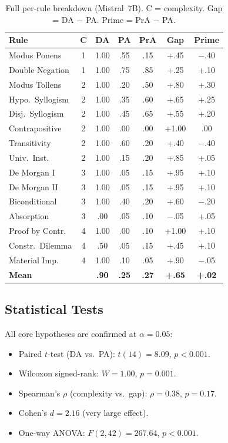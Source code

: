 \documentclass{article}
\newcommand{\da}{\textsc{DA}}
\newcommand{\pa}{\textsc{PA}}
\begin{document}
\begin{table}[t]
\centering
\small
\begin{tabular}{lcccccc}
\toprule
\textbf{Rule} & \textbf{C} & \textbf{DA} & \textbf{PA} & \textbf{PrA} & \textbf{Gap} & \textbf{Prime} \\
\midrule
Modus Ponens      & 1 & 1.00 & .55 & .15 & +.45 & $-$.40 \\
Double Negation   & 1 & 1.00 & .75 & .85 & +.25 & +.10 \\
Modus Tollens     & 2 & 1.00 & .20 & .50 & +.80 & +.30 \\
Hypo.\ Syllogism  & 2 & 1.00 & .35 & .60 & +.65 & +.25 \\
Disj.\ Syllogism  & 2 & 1.00 & .45 & .65 & +.55 & +.20 \\
Contrapositive    & 2 & 1.00 & .00 & .00 & +1.00 & .00 \\
Transitivity      & 2 & 1.00 & .60 & .20 & +.40 & $-$.40 \\
Univ.\ Inst.      & 2 & 1.00 & .15 & .20 & +.85 & +.05 \\
De Morgan I       & 3 & 1.00 & .05 & .15 & +.95 & +.10 \\
De Morgan II      & 3 & 1.00 & .05 & .15 & +.95 & +.10 \\
Biconditional     & 3 & 1.00 & .40 & .20 & +.60 & $-$.20 \\
Absorption        & 3 & .00 & .05 & .10 & $-$.05 & +.05 \\
Proof by Contr.   & 4 & 1.00 & .00 & .10 & +1.00 & +.10 \\
Constr.\ Dilemma  & 4 & .50 & .05 & .15 & +.45 & +.10 \\
Material Imp.     & 4 & 1.00 & .10 & .05 & +.90 & $-$.05 \\
\midrule
\textbf{Mean}     &   & \textbf{.90} & \textbf{.25} & \textbf{.27} & \textbf{+.65} & \textbf{+.02} \\
\bottomrule
\end{tabular}
\caption{Full per-rule breakdown (Mistral~7B). C = complexity. Gap = DA $-$ PA. Prime = PrA $-$ PA.}
\label{tab:per_rule_colm}
\end{table}

\subsection{Statistical Tests}

All core hypotheses are confirmed at $\alpha = 0.05$:
\begin{itemize}
    \item Paired $t$-test (\da{} vs.\ \pa{}): $t(14) = 8.09$, $p < 0.001$.
    \item Wilcoxon signed-rank: $W = 1.00$, $p = 0.001$.
    \item Spearman's $\rho$ (complexity vs.\ gap): $\rho = 0.38$, $p = 0.17$.
    \item Cohen's $d = 2.16$ (very large effect).
    \item One-way ANOVA: $F(2, 42) = 267.64$, $p < 0.001$.
\end{itemize}
\end{document}
